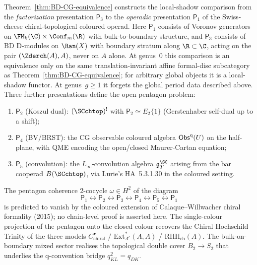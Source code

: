 \begin{remark}
\label{rem:sc-chtop-pentagon}
Theorem~\ref{thm:BD-CG-equivalence} constructs the local-shadow
comparison from the \emph{factorization} presentation
$\mathsf P_3$ to the \emph{operadic} presentation $\mathsf P_1$ of
the Swiss-cheese chiral-topological coloured operad. Here
$\mathsf P_1$ consists of Voronov generators on
$\FM_k(\C) \times \Conf_m(\R)$ with bulk-to-boundary structure, and
$\mathsf P_3$ consists of BD D-modules on
$\Ran(X)$ with boundary stratum along $\R \subset \C$, acting on the
pair $(\Zderch(A), A)$, never on $A$ alone. At genus~$0$ this
comparison is an equivalence only on the same translation-invariant
affine formal-disc subcategory as Theorem~\ref{thm:BD-CG-equivalence};
for arbitrary global objects it is a local-shadow functor. At
genus~$g\ge 1$ it forgets the global period data described above.
Three further presentations define the open pentagon problem:
\begin{enumerate}[label=(\roman*)]
\item $\mathsf P_2$ (Koszul dual): $(\SCchtop)^!$ with
$\mathsf P_2 \simeq E_2\{1\}$ (Gerstenhaber self-dual up to a shift);
\item $\mathsf P_4$ (BV/BRST): the CG observable coloured algebra
$\mathsf{Obs}^{\mathrm{q}}(U)$ on the half-plane, with QME encoding the
open/closed Maurer-Cartan equation;
\item $\mathsf P_5$ (convolution): the $L_\infty$-convolution
algebra $\mathfrak g^{\SC}_T$ arising from the bar cooperad
$B(\SCchtop)$, via Lurie's HA~5.3.1.30 in the coloured setting.
\end{enumerate}
The pentagon coherence 2-cocycle $\omega \in H^2$ of the diagram
\[
\mathsf P_1 \longleftrightarrow \mathsf P_2 \longleftrightarrow
\mathsf P_3 \longleftrightarrow \mathsf P_4 \longleftrightarrow
\mathsf P_5 \longleftrightarrow \mathsf P_1
\]
is predicted to vanish by the coloured extension of
Calaque--Willwacher chiral formality (2015); no chain-level proof is
asserted here. The single-colour
projection of the pentagon onto the closed colour recovers the Chiral
Hochschild Trinity of the three models
$C^\bullet_{\mathrm{chiral}}$ / $\mathrm{Ext}^\ast_{A^e}(A,A)$ /
$\mathrm{RHH}_{\mathrm{ch}}(A)$. The bulk-on-boundary
mixed sector realises the topological double cover $B_2 \to S_2$ that
underlies the q-convention bridge $q_{KL}^2 = q_{DK}$.
\end{remark}

